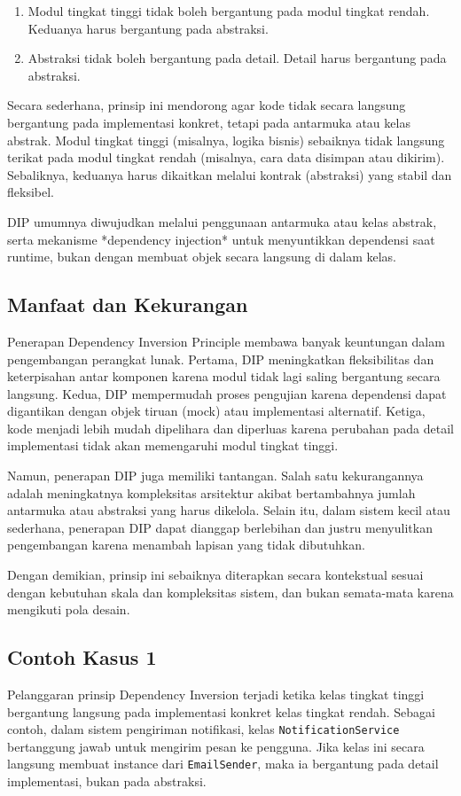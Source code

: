 \begin{enumerate}
	\item Modul tingkat tinggi tidak boleh bergantung pada modul tingkat rendah. Keduanya harus bergantung pada abstraksi.
	\item Abstraksi tidak boleh bergantung pada detail. Detail harus bergantung pada abstraksi.
\end{enumerate}

Secara sederhana, prinsip ini mendorong agar kode tidak secara langsung bergantung pada implementasi konkret, tetapi pada antarmuka atau kelas abstrak. Modul tingkat tinggi (misalnya, logika bisnis) sebaiknya tidak langsung terikat pada modul tingkat rendah (misalnya, cara data disimpan atau dikirim). Sebaliknya, keduanya harus dikaitkan melalui kontrak (abstraksi) yang stabil dan fleksibel.

DIP umumnya diwujudkan melalui penggunaan antarmuka atau kelas abstrak, serta mekanisme *dependency injection* untuk menyuntikkan dependensi saat runtime, bukan dengan membuat objek secara langsung di dalam kelas.

\subsection{Manfaat dan Kekurangan}
Penerapan Dependency Inversion Principle membawa banyak keuntungan dalam pengembangan perangkat lunak. Pertama, DIP meningkatkan fleksibilitas dan keterpisahan antar komponen karena modul tidak lagi saling bergantung secara langsung. Kedua, DIP mempermudah proses pengujian karena dependensi dapat digantikan dengan objek tiruan (mock) atau implementasi alternatif. Ketiga, kode menjadi lebih mudah dipelihara dan diperluas karena perubahan pada detail implementasi tidak akan memengaruhi modul tingkat tinggi.

Namun, penerapan DIP juga memiliki tantangan. Salah satu kekurangannya adalah meningkatnya kompleksitas arsitektur akibat bertambahnya jumlah antarmuka atau abstraksi yang harus dikelola. Selain itu, dalam sistem kecil atau sederhana, penerapan DIP dapat dianggap berlebihan dan justru menyulitkan pengembangan karena menambah lapisan yang tidak dibutuhkan.

Dengan demikian, prinsip ini sebaiknya diterapkan secara kontekstual sesuai dengan kebutuhan skala dan kompleksitas sistem, dan bukan semata-mata karena mengikuti pola desain.

\subsection{Contoh Kasus 1}
Pelanggaran prinsip Dependency Inversion terjadi ketika kelas tingkat tinggi bergantung langsung pada implementasi konkret kelas tingkat rendah. Sebagai contoh, dalam sistem pengiriman notifikasi, kelas \texttt{NotificationService} bertanggung jawab untuk mengirim pesan ke pengguna. Jika kelas ini secara langsung membuat instance dari \texttt{EmailSender}, maka ia bergantung pada detail implementasi, bukan pada abstraksi.

